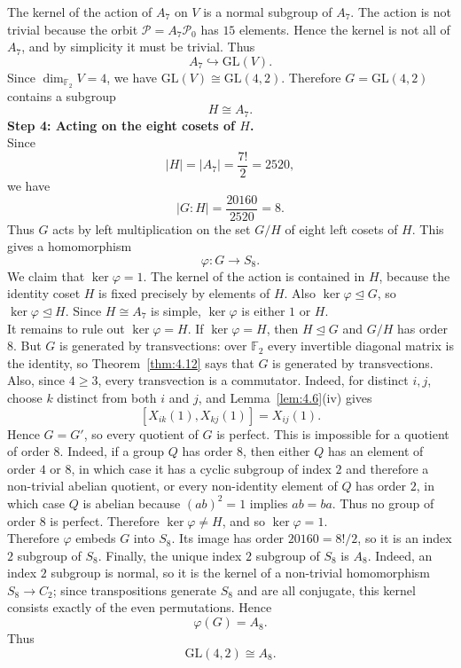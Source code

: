 \documentclass[../Odyssey_Project.tex]{subfiles}
\begin{document}
\begin{solution}
The kernel of the action of $A_7$ on $V$ is a normal subgroup of $A_7$. The action is not trivial because the orbit $\mathcal P=A_7\mathcal P_0$ has $15$ elements. Hence the kernel is not all of $A_7$, and by simplicity it must be trivial. Thus
\[
    A_7\hookrightarrow \mathrm{GL}(V).
\]
Since $\dim_{\mathbb F_2}V=4$, we have $\mathrm{GL}(V)\cong \mathrm{GL}(4,2)$. Therefore $G=\mathrm{GL}(4,2)$ contains a subgroup
\[
    H\cong A_7.
\]
\noindent\textbf{Step 4: Acting on the eight cosets of $H$.}\\
Since
\[
    |H|=|A_7|=\frac{7!}{2}=2520,
\]
we have
\[
    |G:H|=\frac{20160}{2520}=8.
\]
Thus $G$ acts by left multiplication on the set $G/H$ of eight left cosets of $H$. This gives a homomorphism
\[
    \varphi\colon G\to S_8.
\]
We claim that $\ker\varphi=1$. The kernel of the action is contained in $H$, because the identity coset $H$ is fixed precisely by elements of $H$. Also $\ker\varphi\trianglelefteq G$, so $\ker\varphi\trianglelefteq H$. Since $H\cong A_7$ is simple, $\ker\varphi$ is either $1$ or $H$.\\
It remains to rule out $\ker\varphi=H$. If $\ker\varphi=H$, then $H\trianglelefteq G$ and $G/H$ has order $8$. But $G$ is generated by transvections: over $\mathbb F_2$ every invertible diagonal matrix is the identity, so Theorem~\ref{thm:4.12} says that $G$ is generated by transvections. Also, since $4\geq 3$, every transvection is a commutator. Indeed, for distinct $i,j$, choose $k$ distinct from both $i$ and $j$, and Lemma~\ref{lem:4.6}(iv) gives
\[
    [X_{ik}(1),X_{kj}(1)]=X_{ij}(1).
\]
Hence $G=G'$, so every quotient of $G$ is perfect. This is impossible for a quotient of order $8$. Indeed, if a group $Q$ has order $8$, then either $Q$ has an element of order $4$ or $8$, in which case it has a cyclic subgroup of index $2$ and therefore a non-trivial abelian quotient, or every non-identity element of $Q$ has order $2$, in which case $Q$ is abelian because $(ab)^2=1$ implies $ab=ba$. Thus no group of order $8$ is perfect. Therefore $\ker\varphi\neq H$, and so $\ker\varphi=1$.\\
Therefore $\varphi$ embeds $G$ into $S_8$. Its image has order $20160=8!/2$, so it is an index $2$ subgroup of $S_8$. Finally, the unique index $2$ subgroup of $S_8$ is $A_8$. Indeed, an index $2$ subgroup is normal, so it is the kernel of a non-trivial homomorphism $S_8\to C_2$; since transpositions generate $S_8$ and are all conjugate, this kernel consists exactly of the even permutations. Hence
\[
    \varphi(G)=A_8.
\]
Thus
\[
    \mathrm{GL}(4,2)\cong A_8.
\]
\end{solution}
\end{document}
